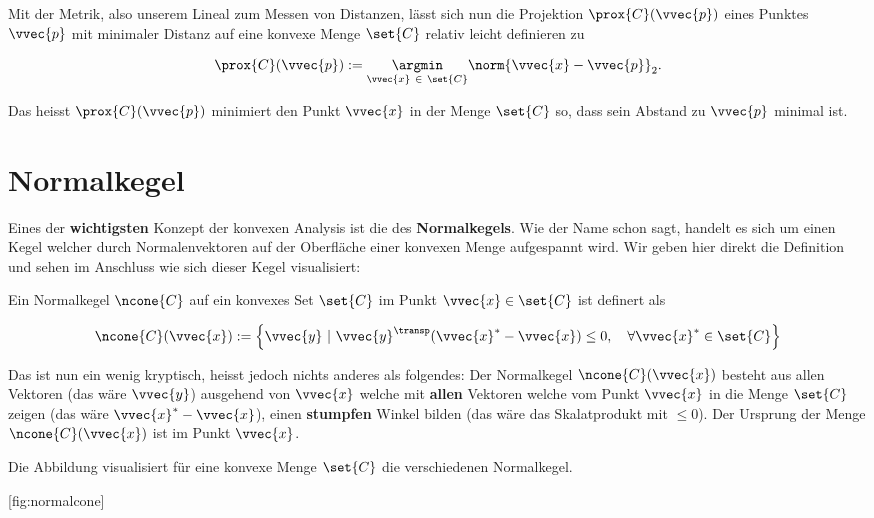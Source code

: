 \documentclass[
  12pt,
  american,
  a4paper,
  twoside,
  titlepage,
  openright,
  numbers=noenddot,
  chapterprefix=true,
  headings=optiontohead,
  svgnames,
  dvipsnames]{scrreprt}
\begin{document}
Mit der Metrik, also unserem Lineal zum Messen von Distanzen, lässt sich
nun die Projektion \(\prox{C}(\vvec{p})\) eines Punktes \(\vvec{p}\) mit
minimaler Distanz auf eine konvexe Menge \(\set{C}\) relativ leicht
definieren zu

\begin{align}
\prox{C}(\vvec{p}) :=  \underset{\vvec{x} \ \in \ \set{C}}{\argmin} \norm{\vvec{x} - \vvec{p}}_2.
\end{align}

Das heisst \(\prox{C}(\vvec{p})\) minimiert den Punkt \(\vvec{x}\) in
der Menge \(\set{C}\) so, dass sein Abstand zu \(\vvec{p}\) minimal ist.

\hypertarget{normalkegel}{%
\section{Normalkegel}\label{normalkegel}}

Eines der \textbf{wichtigsten} Konzept der konvexen Analysis ist die des
\textbf{Normalkegels}. Wie der Name schon sagt, handelt es sich um einen
Kegel welcher durch Normalenvektoren auf der Oberfläche einer konvexen
Menge aufgespannt wird. Wir geben hier direkt die Definition und sehen
im Anschluss wie sich dieser Kegel visualisiert:

Ein Normalkegel \(\ncone{C}\) auf ein konvexes Set \(\set{C}\) im Punkt
\(\vvec{x} \in \set{C}\) ist definert als

\begin{align}
    \ncone{C}(\vvec{x}) := \left\{ \vvec{y} \ | \ \vvec{y}^\transp(\vvec{x}^* - \vvec{x}) \leq 0, \quad \forall \vvec{x}^* \in \set{C} \right\}
\end{align}

Das ist nun ein wenig kryptisch, heisst jedoch nichts anderes als
folgendes: Der Normalkegel \(\ncone{C}(\vvec{x})\) besteht aus allen
Vektoren (das wäre \(\vvec{y}\)) ausgehend von \(\vvec{x}\) welche mit
\textbf{allen} Vektoren welche vom Punkt \(\vvec{x}\) in die Menge
\(\set{C}\) zeigen (das wäre \(\vvec{x}^* - \vvec{x}\)), einen
\textbf{stumpfen} Winkel bilden (das wäre das Skalatprodukt mit
\(\leq 0\)). Der Ursprung der Menge \(\ncone{C}(\vvec{x})\) ist im Punkt
\(\vvec{x}\).

Die Abbildung  visualisiert für eine konvexe
Menge \(\set{C}\) die verschiedenen Normalkegel.

[fig:normalcone]
\end{document}
